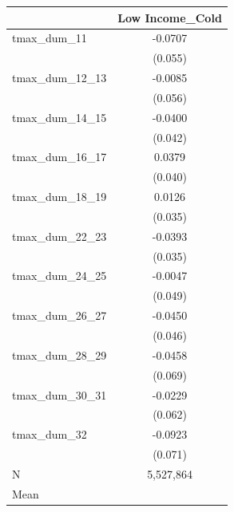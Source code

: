 {
\def\sym#1{\ifmmode^{#1}\else\(^{#1}\)\fi}
\begin{tabular}{l*{1}{c}}
\toprule
            &\multicolumn{1}{c}{Low Income\_Cold}\\
\midrule
tmax\_dum\_11 &     -0.0707         \\
            &     (0.055)         \\
tmax\_dum\_12\_13&     -0.0085         \\
            &     (0.056)         \\
tmax\_dum\_14\_15&     -0.0400         \\
            &     (0.042)         \\
tmax\_dum\_16\_17&      0.0379         \\
            &     (0.040)         \\
tmax\_dum\_18\_19&      0.0126         \\
            &     (0.035)         \\
tmax\_dum\_22\_23&     -0.0393         \\
            &     (0.035)         \\
tmax\_dum\_24\_25&     -0.0047         \\
            &     (0.049)         \\
tmax\_dum\_26\_27&     -0.0450         \\
            &     (0.046)         \\
tmax\_dum\_28\_29&     -0.0458         \\
            &     (0.069)         \\
tmax\_dum\_30\_31&     -0.0229         \\
            &     (0.062)         \\
tmax\_dum\_32 &     -0.0923         \\
            &     (0.071)         \\
\midrule
N           &   5,527,864         \\
Mean        &                     \\
\bottomrule
\end{tabular}
}

